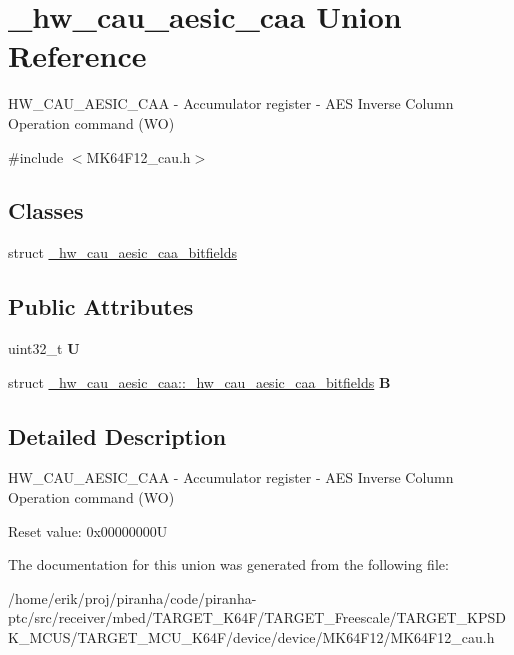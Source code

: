 \hypertarget{union__hw__cau__aesic__caa}{}\section{\+\_\+hw\+\_\+cau\+\_\+aesic\+\_\+caa Union Reference}
\label{union__hw__cau__aesic__caa}


H\+W\+\_\+\+C\+A\+U\+\_\+\+A\+E\+S\+I\+C\+\_\+\+C\+AA -\/ Accumulator register -\/ A\+ES Inverse Column Operation command (WO)  




{\ttfamily \#include $<$M\+K64\+F12\+\_\+cau.\+h$>$}

\subsection*{Classes}
\begin{DoxyCompactItemize}
\item 
struct \hyperlink{struct__hw__cau__aesic__caa_1_1__hw__cau__aesic__caa__bitfields}{\+\_\+hw\+\_\+cau\+\_\+aesic\+\_\+caa\+\_\+bitfields}
\end{DoxyCompactItemize}
\subsection*{Public Attributes}
\begin{DoxyCompactItemize}
\item 
uint32\+\_\+t {\bfseries U}\hypertarget{union__hw__cau__aesic__caa_acaf62af90a980063fda36ac0bdb75f62}{}\label{union__hw__cau__aesic__caa_acaf62af90a980063fda36ac0bdb75f62}

\item 
struct \hyperlink{struct__hw__cau__aesic__caa_1_1__hw__cau__aesic__caa__bitfields}{\+\_\+hw\+\_\+cau\+\_\+aesic\+\_\+caa\+::\+\_\+hw\+\_\+cau\+\_\+aesic\+\_\+caa\+\_\+bitfields} {\bfseries B}\hypertarget{union__hw__cau__aesic__caa_aa81a767f4abc06745437face21b38350}{}\label{union__hw__cau__aesic__caa_aa81a767f4abc06745437face21b38350}

\end{DoxyCompactItemize}


\subsection{Detailed Description}
H\+W\+\_\+\+C\+A\+U\+\_\+\+A\+E\+S\+I\+C\+\_\+\+C\+AA -\/ Accumulator register -\/ A\+ES Inverse Column Operation command (WO) 

Reset value\+: 0x00000000U 

The documentation for this union was generated from the following file\+:\begin{DoxyCompactItemize}
\item 
/home/erik/proj/piranha/code/piranha-\/ptc/src/receiver/mbed/\+T\+A\+R\+G\+E\+T\+\_\+\+K64\+F/\+T\+A\+R\+G\+E\+T\+\_\+\+Freescale/\+T\+A\+R\+G\+E\+T\+\_\+\+K\+P\+S\+D\+K\+\_\+\+M\+C\+U\+S/\+T\+A\+R\+G\+E\+T\+\_\+\+M\+C\+U\+\_\+\+K64\+F/device/device/\+M\+K64\+F12/M\+K64\+F12\+\_\+cau.\+h\end{DoxyCompactItemize}
